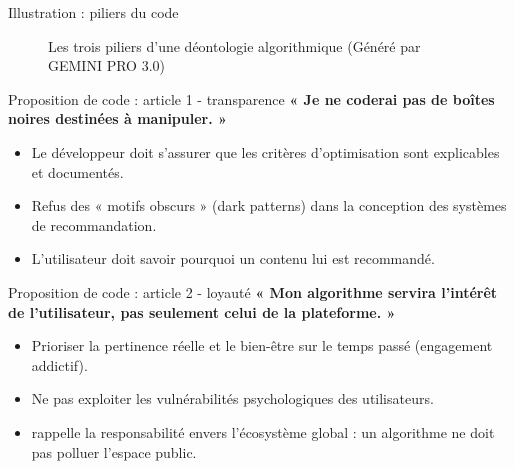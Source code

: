\documentclass[9pt, aspectratio=169]{beamer}
\begin{document}
\begin{frame}{Illustration : piliers du code}
    \begin{figure}
        \centering
        \caption{Les trois piliers d'une déontologie algorithmique (Généré par GEMINI PRO 3.0)}
    \end{figure}
\end{frame}

\begin{frame}{Proposition de code : article 1 - transparence}
    \textbf{« Je ne coderai pas de boîtes noires destinées à manipuler. »}
    \vspace{0.5cm}
    \begin{itemize}
        \item Le développeur doit s'assurer que les critères d'optimisation sont explicables et documentés.
        \item Refus des « motifs obscurs » (dark patterns) dans la conception des systèmes de recommandation.
        \item L'utilisateur doit savoir pourquoi un contenu lui est recommandé.
    \end{itemize}
\end{frame}

\begin{frame}{Proposition de code : article 2 - loyauté}
    \textbf{« Mon algorithme servira l'intérêt de l'utilisateur, pas seulement celui de la plateforme. »}
    \vspace{0.5cm}
    \begin{itemize}
        \item Prioriser la pertinence réelle et le bien-être sur le temps passé (engagement addictif).
        \item Ne pas exploiter les vulnérabilités psychologiques des utilisateurs.
        \item \cite{Biosphere2015} rappelle la responsabilité envers l'écosystème global : un algorithme ne doit pas polluer l'espace public.
    \end{itemize}
\end{frame}
\end{document}
